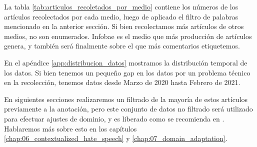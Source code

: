 La tabla \ref{tab:articulos_recoletados_por_medio} contiene los números de los artículos recolectados por cada medio, luego de aplicado el filtro de palabras mencionado en la anterior sección. Si bien recolectamos más artículos de otros medios, no son enumerados. Infobae es el medio que más producción de artículos genera, y también será finalmente sobre el que más comentarios etiquetemos.

En el apéndice \ref{app:distribucion_datos} mostramos la distribución temporal de los datos. Si bien tenemos un pequeño gap en los datos por un problema técnico en la recolección, tenemos datos desde Marzo de 2020 hasta Febrero de 2021.

En siguientes secciones realizaremos un filtrado de la mayoría de estos artículos previamente a la anotación, pero este conjunto de datos no filtrado será utilizado para efectuar ajustes de dominio, y es liberado como se recomienda en \citet{gururangan-etal-2020-dont}. Hablaremos más sobre esto en los capítulos \ref{chap:06_contextualized_hate_speech} y \ref{chap:07_domain_adaptation}.

